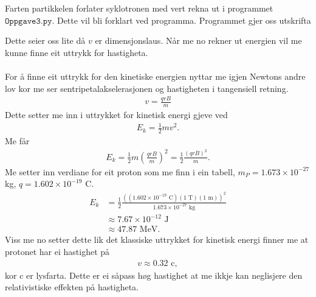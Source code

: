 \documentclass[11pt, a4paper]{article}
\begin{document}
  Farten partikkelen forlater syklotronen med vert rekna ut i programmet $\texttt{Oppgave3.py}$. Dette vil bli forklart ved programma. %
  Programmet gjer oss utskrifta
  \begin{center}
    
  \end{center}
  Dette seier oss lite då $v$ er dimensjonslaus. Når me no rekner ut energien vil me kunne finne eit uttrykk for hastigheta. \\ \\
  For å finne eit uttrykk for den kinetiske energien nyttar me igjen Newtons andre lov kor me ser sentripetalakselerasjonen og hastigheten i tangensiell retning.
  \begin{align*}
    v = \frac{qrB}{m}
  \end{align*}
  Dette setter me inn i uttrykket for kinetisk energi gjeve ved
  \begin{align*}
    E_k = \frac{1}{2}mv^2.
  \end{align*}
  Me får
  \begin{align*}
    E_k = \frac{1}{2}m\left( \frac{qrB}{m} \right)^2 = \frac{1}{2}\frac{\left( qrB \right)^2}{m}.
  \end{align*}
  Me setter inn verdiane for eit proton som me finn i ein tabell, $m_P = 1.673\times10^{-27}$ kg, $q = 1.602\times10^{-19}$ C.
  \begin{align*}
    E_k &= \frac{1}{2}\frac{\left( (1.602\times10^{-19}\text{ C})(1 \text{ T})(1\text{ m}) \right)^2}{1.673\times10^{-27}\text{ kg}} \\
    &\approx 7.67\times10^{-12}\text{ J} \\
    &\approx 47.87 \text{ MeV}.
  \end{align*}
  Viss me no setter dette lik det klassiske uttrykket for kinetisk energi finner me at protonet har ei hastighet på 
  \begin{align*}
    v \approx 0.32\text{ c},
  \end{align*}
  kor c er lysfarta. Dette er ei såpass høg hastighet at me ikkje kan neglisjere den relativistiske effekten på hastigheta. \\ \\
\end{document}
